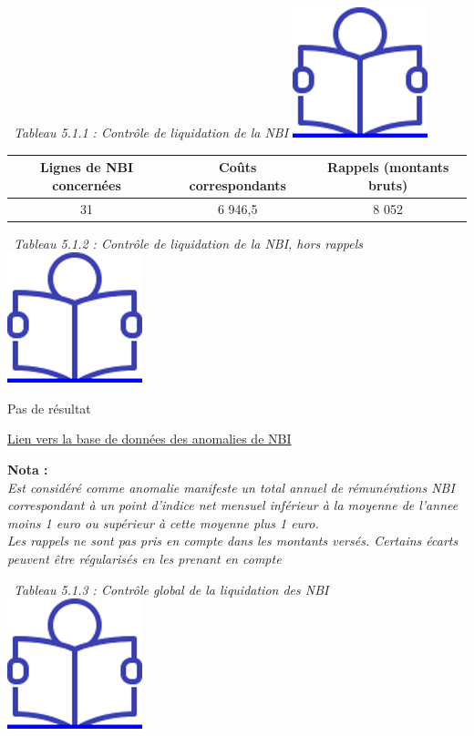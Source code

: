 ~\emph{Tableau 5.1.1 : Contrôle de liquidation de la NBI}
\href{../Docs/Notices/fiche_NBI_liq.odt}{\includegraphics{icones/Notice.png}}

\begin{longtable}[]{@{}ccc@{}}
\toprule
Lignes de NBI concernées & Coûts correspondants & Rappels (montants
bruts)\tabularnewline
\midrule
\endhead
31 & 6 946,5 & 8 052\tabularnewline
\bottomrule
\end{longtable}

~\emph{Tableau 5.1.2 : Contrôle de liquidation de la NBI, hors rappels}
~
\href{../Docs/Notices/fiche_NBI_liq.odt}{\includegraphics{icones/Notice.png}}

Pas de résultat

\href{../Bases/Fiabilite/lignes.nbi.anormales.csv}{Lien vers la base de
données des anomalies de NBI}

\textbf{Nota :}\\
\emph{Est considéré comme anomalie manifeste un total annuel de
rémunérations NBI correspondant à un point d'indice net mensuel
inférieur à la moyenne de l'annee moins 1 euro ou supérieur à cette
moyenne plus 1 euro.}\\
\emph{Les rappels ne sont pas pris en compte dans les montants versés.
Certains écarts peuvent être régularisés en les prenant en compte}

~\emph{Tableau 5.1.3 : Contrôle global de la liquidation des NBI} ~
\href{../Docs/Notices/fiche_NBI_glob.odt}{\includegraphics{icones/Notice.png}}

